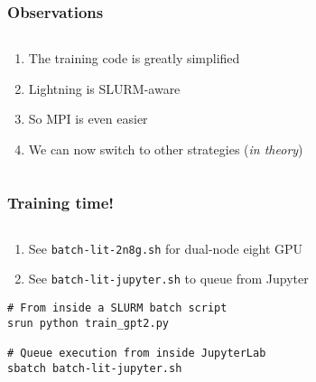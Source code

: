 \documentclass[
	notes=none,
	aspectratio=169
]{beamer}
\begin{document}

\begin{frame}
\frametitle{Observations}

\begin{columns}[T]
\begin{column}[T]{1.0\textwidth}
\setlength{\parskip}{0.5em}

\vspace{0.0cm}
\begin{enumerate}
\setlength{\parskip}{0.5em}
\item The training code is greatly simplified
\item Lightning is SLURM-aware
\item So MPI is even easier
\item We can now switch to other strategies ({\it in theory})
\end{enumerate}

\end{column}
\end{columns}

\end{frame}
\note{
}


\begin{frame}[fragile]
\frametitle{Training time!}

\begin{columns}[T]
\begin{column}[T]{1.0\textwidth}
\setlength{\parskip}{0.5em}

\vspace{0.0cm}
\begin{enumerate}
\setlength{\parskip}{0.5em}
\item See {\tt batch-lit-2n8g.sh} for dual-node eight GPU
\item See {\tt batch-lit-jupyter.sh} to queue from Jupyter
\end{enumerate}

\begin{lstlisting}[backgroundcolor = \color{darkgray},language=shell]
# From inside a SLURM batch script
srun python train_gpt2.py

# Queue execution from inside JupyterLab
sbatch batch-lit-jupyter.sh
\end{lstlisting}

\end{column}
\end{columns}

\end{frame}
\note{
}
\end{document}
